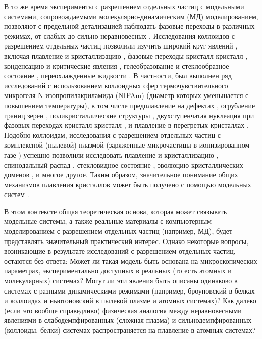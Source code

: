 В то же время эксперименты с разрешением отдельных частиц с модельными системами, сопровождаемыми молекулярно-динамическим (МД) моделированием, позволяют с предельной детализацией наблюдать фазовые переходы в различных режимах, от слабых до сильно неравновесных \cite{book.ivlev}.
Исследования коллоидов с разрешением отдельных частиц позволили изучить широкий круг явлений \cite{10.1038/natrevmats.2015.11, 10.1039/c9sm01953g}, включая плавление и кристаллизацию \cite{10.1126/science.1112399, 10.1038/ncomms8110},
фазовые переходы кристалл-кристалл \cite{10.1038/ncomms14978, 10.1103/physrevlett.119.128001, 10.1039/c5sm01551k},
конденсацию и критические явления \cite{10.1038/nphys679},
гелеобразование и стеклообразное состояние \cite{10.1016/j.physrep.2014.11.004},
переохлажденные жидкости \cite{10.1126/science.287.5453.627}.
В частности, был выполнен ряд исследований с использованием коллоидных сфер термочувствительного микрогеля N-изопропилакриламида (NIPAm) (диаметр которых уменьшается с повышением температуры),
в том числе предплавление на дефектах \cite{10.1126/science.1112399},
огрубление границ зерен \cite{10.1103/physrevx.8.021045},
поликристаллические структуры \cite{10.1103/physrevx.8.041023},
двухступенчатая нуклеация при фазовых переходах кристалл-кристалл \cite{10.1038/nmat4083},
и плавление в перегретых кристаллах \cite{10.1126/science.1224763}.
Подобно коллоидам, исследования с разрешением отдельных частиц с комплексной (пылевой) плазмой (заряженные микрочастицы в ионизированном газе \cite{10.1039/c0sm00813c}) успешно позволили исследовать плавление и кристаллизацию \cite{10.1103/physrevlett.80.5345, 10.1103/physrevlett.105.115004, 10.1038/nphys242},
спинодальный распад \cite{10.1103/physrevlett.105.045001, 10.1103/physrevlett.116.115002},
стекловидное состояние \cite{10.1209/0295-5075/123/35001, 10.1103/physreve.91.052301},
эволюцию кристаллических доменов \cite{10.1103/physrevlett.124.165001},
и многое другое. 
Таким образом, значительное понимание общих механизмов плавления кристаллов может быть получено с помощью модельных систем \cite{book.ivlev, 10.1039/c0sm00813c}.

В этом контексте общая теоретическая основа, которая может связывать модельные системы, а также реальные материалы с компьютерным моделированием с разрешением отдельных частиц (например, МД), будет представлять значительный практический интерес.
Однако некоторые вопросы, возникающие в результате исследований с разрешением отдельных частиц, остаются без ответа:
Может ли такая модель быть основана на микроскопических параметрах, экспериментально доступных в реальных (то есть атомных и молекулярных) системах?
Могут ли эти явления быть описаны одинаково в системах с разными динамическими режимами (например, броуновский в белках и коллоидах и ньютоновский в пылевой плазме и атомных системах)?
Как далеко (если это вообще справедливо) физическая аналогия между неравновесными явлениями в слабодемпфированных (сложная плазма) и сильнодемпфированных (коллоиды, белки) системах распространяется на плавление в атомных системах?

